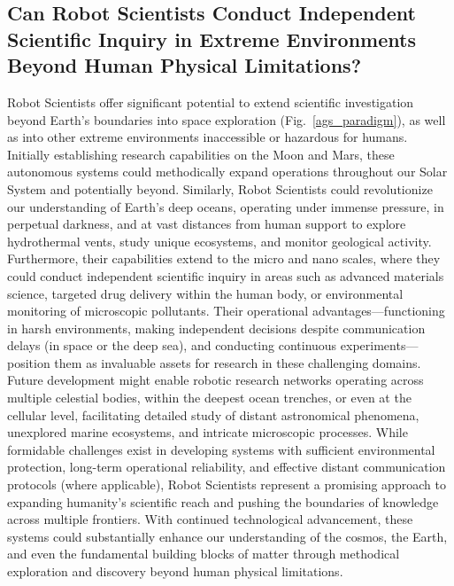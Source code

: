 \subsection*{Can Robot Scientists Conduct Independent Scientific Inquiry in Extreme Environments Beyond Human Physical Limitations?}

Robot Scientists offer significant potential to extend scientific investigation beyond Earth's boundaries into space exploration (Fig.~\ref{ags_paradigm}), as well as into other extreme environments inaccessible or hazardous for humans. Initially establishing research capabilities on the Moon and Mars, these autonomous systems could methodically expand operations throughout our Solar System and potentially beyond. Similarly, Robot Scientists could revolutionize our understanding of Earth's deep oceans, operating under immense pressure, in perpetual darkness, and at vast distances from human support to explore hydrothermal vents, study unique ecosystems, and monitor geological activity. Furthermore, their capabilities extend to the micro and nano scales, where they could conduct independent scientific inquiry in areas such as advanced materials science, targeted drug delivery within the human body, or environmental monitoring of microscopic pollutants. Their operational advantages—functioning in harsh environments, making independent decisions despite communication delays (in space or the deep sea), and conducting continuous experiments—position them as invaluable assets for research in these challenging domains. Future development might enable robotic research networks operating across multiple celestial bodies, within the deepest ocean trenches, or even at the cellular level, facilitating detailed study of distant astronomical phenomena, unexplored marine ecosystems, and intricate microscopic processes. While formidable challenges exist in developing systems with sufficient environmental protection, long-term operational reliability, and effective distant communication protocols (where applicable), Robot Scientists represent a promising approach to expanding humanity's scientific reach and pushing the boundaries of knowledge across multiple frontiers. With continued technological advancement, these systems could substantially enhance our understanding of the cosmos, the Earth, and even the fundamental building blocks of matter through methodical exploration and discovery beyond human physical limitations.